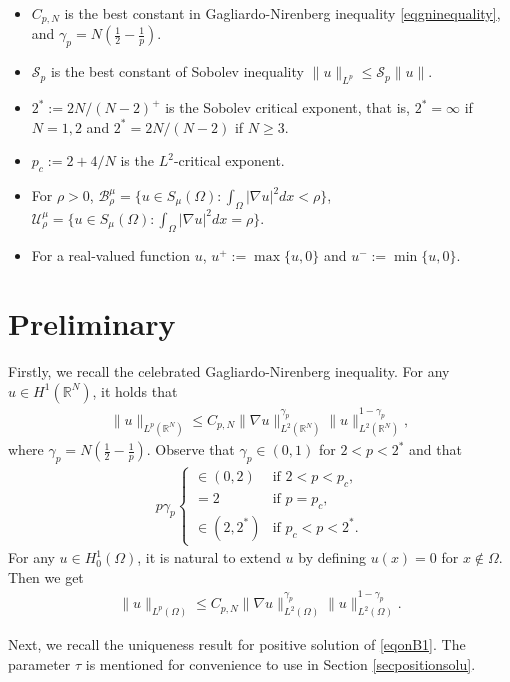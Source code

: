 \documentclass[10pt,a4paper]{article}
\theoremstyle{definition} \theoremstyle{remark}
\numberwithin{equation}{section}
\newcommand{\R}{\mathbb{R}}
\newcommand{\B}{\mathcal{B}}
\newcommand{\U}{\mathcal{U}}
\newcommand{\ga}{\gamma}
\begin{document}
\begin{itemize}
 	\item $C_{p,N}$ is the best constant in Gagliardo-Nirenberg inequality \eqref{eqgninequality}, and $\ga_p = N(\frac12 -\frac1p)$.
 	\item $\mathcal{S}_p$ is the best constant of Sobolev inequality $\|u\|_{L^p} \le \mathcal{S}_p\|u\|$.
 	\item $2^* := 2N/(N-2)^+$ is the Sobolev critical exponent, that is, $2^* = \infty$ if $N =1,2$ and $2^* = 2N/(N-2)$ if $N \ge 3$.
 	\item $p_c := 2 + 4/N$ is the $L^2$-critical exponent.
 	\item For $\rho > 0$, $\B_\rho^\mu = \bigl\{u \in S_\mu(\Omega): \int_\Omega|\nabla u|^2dx < \rho\bigr\}$, $\U_\rho^\mu = \bigl\{u \in S_\mu(\Omega): \int_\Omega|\nabla u|^2dx = \rho\bigr\}$.
 	\item For a real-valued function $u$, $u^+ := \max\{u,0\}$ and $u^- := \min\{u,0\}$.
\end{itemize}

\section{Preliminary} \label{secpre}

Firstly, we recall the celebrated Gagliardo-Nirenberg inequality. For any $u \in H^1(\R^N)$, it holds that
\begin{align} \label{eqgninequality}
	\|u\|_{L^p(\R^N)} \le C_{p,N}\|\nabla u\|_{L^2(\R^N)}^{\ga_p} \|u\|_{L^2(\R^N)}^{1-\ga_p},
\end{align}
where $\ga_p = N(\frac12 -\frac1p)$. Observe that $\ga_p \in (0,1)$ for $2 < p < 2^*$ and that
\begin{align*}
	p\ga_p
		\begin{cases}
			\in (0,2)  & \text{if } 2 < p < p_c, \\
			= 2  & \text{if } p = p_c, \\
			\in (2,2^*) & \text{if } p_c < p < 2^*.
		\end{cases}
\end{align*}
For any $u \in H_0^1(\Omega)$, it is natural to extend $u$ by defining $u(x) = 0$ for $x \notin \Omega$. Then we get
\begin{align} \label{eqgndomain}
	\|u\|_{L^p(\Omega)} \le C_{p,N}\|\nabla u\|_{L^2(\Omega)}^{\ga_p} \|u\|_{L^2(\Omega)}^{1-\ga_p}.
\end{align}

Next, we recall the uniqueness result for positive solution of \eqref{eqonB1}. The parameter $\tau$ is mentioned for convenience to use in Section \ref{secpositionsolu}.
\end{document}
